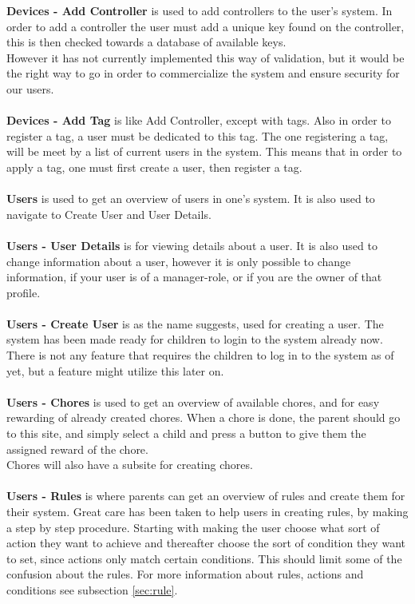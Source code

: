 \textbf{Devices - Add Controller} is used to add controllers to the user's system. In order to add a controller the user must add a unique key found on the controller, this is then checked towards a database of available keys.\\
However it has not currently implemented this way of validation, but it would be the right way to go in order to commercialize the system and ensure security for our users.\\
\\
\textbf{Devices - Add Tag} is like Add Controller, except with tags. Also in order to register a tag, a user must be dedicated to this tag. The one registering a tag, will be meet by a list of current users in the system. This means that in order to apply a tag, one must first create a user, then register a tag.\\
\\
\textbf{Users} is used to get an overview of users in one's system. It is also used to navigate to Create User and User Details.\\
\\
\textbf{Users - User Details} is for viewing details about a user. It is also used to change information about a user, however it is only possible to change information, if your user is of a manager-role, or if you are the owner of that profile.\\
\\
\textbf{Users - Create User} is as the name suggests, used for creating a user. The system has been made ready for children to login to the system already now. There is not any feature that requires the children to log in to the system as of yet, but a feature might utilize this later on.\\
\\
\textbf{Users - Chores} is used to get an overview of available chores, and for easy rewarding of already created chores. When a chore is done, the parent should go to this site, and simply select a child and press a button to give them the assigned reward of the chore.\\
Chores will also have a subsite for creating chores.\\
\\
\textbf{Users - Rules} is where parents can get an overview of rules and create them for their system. Great care has been taken to help users in creating rules, by making a step by step procedure. Starting with making the user choose what sort of action they want to achieve and thereafter choose the sort of condition they want to set, since actions only match certain conditions. This should limit some of the confusion about the rules. For more information about rules, actions and conditions see subsection \vref{sec:rule}.\\
